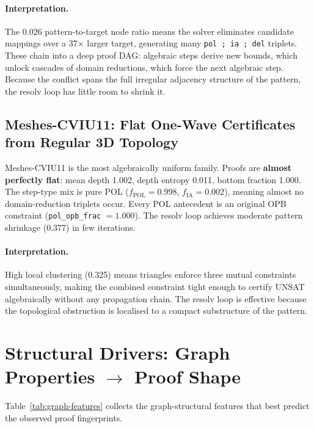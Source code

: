 \documentclass[11pt,a4paper]{article}
\begin{document}
\paragraph{Interpretation.} The 0.026 pattern-to-target node ratio means the solver eliminates
candidate mappings over a 37$\times$ larger target, generating many \texttt{pol\,;\,ia\,;\,del}
triplets.
These chain into a deep proof DAG: algebraic steps derive new bounds, which unlock cascades of
domain reductions, which force the next algebraic step.
Because the conflict spans the full irregular adjacency structure of the pattern, the resolv loop
has little room to shrink it.

\subsection{Meshes-CVIU11: Flat One-Wave Certificates from Regular 3D Topology}
\label{sec:fingerprint-meshes}

Meshes-CVIU11 is the most algebraically uniform family.
Proofs are \textbf{almost perfectly flat}: mean depth 1.002, depth entropy 0.011, bottom
fraction 1.000.
The step-type mix is pure POL ($f_{\mathrm{POL}} = 0.998$, $f_{\mathrm{IA}} = 0.002$),
meaning almost no domain-reduction triplets occur.
Every POL antecedent is an original OPB constraint (\texttt{pol\_opb\_frac} $= 1.000$).
The resolv loop achieves moderate pattern shrinkage (0.377) in few iterations.

\paragraph{Interpretation.} High local clustering (0.325) means triangles enforce three mutual
constraints simultaneously, making the combined constraint tight enough to certify UNSAT
algebraically without any propagation chain.
The resolv loop is effective because the topological obstruction is localised to a compact
substructure of the pattern.

\section{Structural Drivers: Graph Properties $\to$ Proof Shape}
\label{sec:drivers}

Table~\ref{tab:graph-features} collects the graph-structural features that best predict the
observed proof fingerprints.
\end{document}
